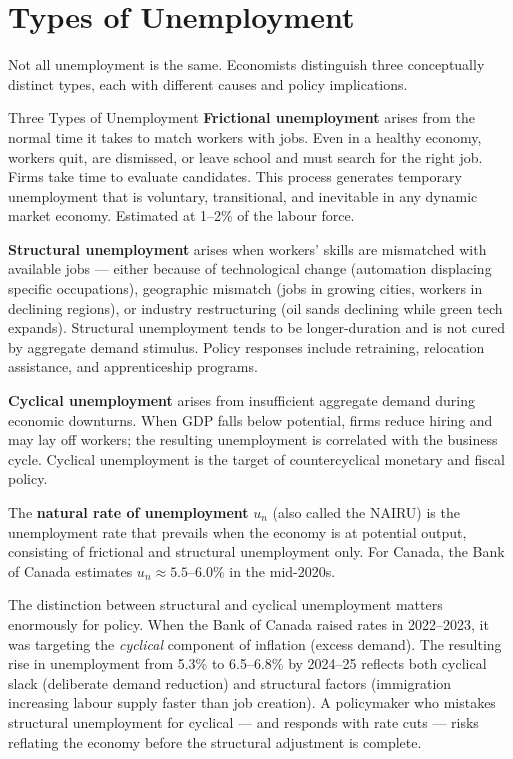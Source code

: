\section{Types of Unemployment}
\label{sec:unemployment_types}

Not all unemployment is the same. Economists distinguish three conceptually
distinct types, each with different causes and policy implications.

\begin{defbox}{Three Types of Unemployment}
\textbf{Frictional unemployment} arises from the normal time it takes
to match workers with jobs. Even in a healthy economy, workers quit,
are dismissed, or leave school and must search for the right job.
Firms take time to evaluate candidates. This process generates temporary
unemployment that is voluntary, transitional, and inevitable in any
dynamic market economy. Estimated at 1--2\% of the labour force.

\textbf{Structural unemployment} arises when workers' skills are
mismatched with available jobs --- either because of technological
change (automation displacing specific occupations), geographic
mismatch (jobs in growing cities, workers in declining regions), or
industry restructuring (oil sands declining while green tech expands).
Structural unemployment tends to be longer-duration and is not cured
by aggregate demand stimulus. Policy responses include retraining,
relocation assistance, and apprenticeship programs.

\textbf{Cyclical unemployment} arises from insufficient aggregate
demand during economic downturns. When GDP falls below potential,
firms reduce hiring and may lay off workers; the resulting unemployment
is correlated with the business cycle. Cyclical unemployment is the
target of countercyclical monetary and fiscal policy.

The \textbf{natural rate of unemployment} $u_n$ (also called the
NAIRU) is the unemployment rate that prevails when the economy is
at potential output, consisting of frictional and structural
unemployment only. For Canada, the Bank of Canada estimates
$u_n \approx 5.5$--$6.0\%$ in the mid-2020s.
\end{defbox}

The distinction between structural and cyclical unemployment matters
enormously for policy. When the Bank of Canada raised rates in 2022--2023,
it was targeting the \textit{cyclical} component of inflation (excess
demand). The resulting rise in unemployment from 5.3\% to 6.5--6.8\%
by 2024--25 reflects both cyclical slack (deliberate demand reduction)
and structural factors (immigration increasing labour supply faster than
job creation). A policymaker who mistakes structural unemployment for
cyclical --- and responds with rate cuts --- risks reflating the economy
before the structural adjustment is complete.


